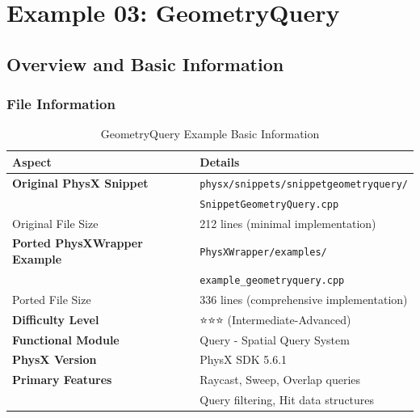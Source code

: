 
\section{Example 03: GeometryQuery}

\subsection{Overview and Basic Information}

\subsubsection{File Information}

\begin{table}[h]
\centering
\begin{tabular}{|l|l|}
\hline
\textbf{Aspect} & \textbf{Details} \\
\hline
\textbf{Original PhysX Snippet} & \texttt{physx/snippets/snippetgeometryquery/} \\
 & \texttt{SnippetGeometryQuery.cpp} \\
\hline
Original File Size & 212 lines (minimal implementation) \\
\hline
\textbf{Ported PhysXWrapper Example} & \texttt{PhysXWrapper/examples/} \\
 & \texttt{example\_geometryquery.cpp} \\
\hline
Ported File Size & 336 lines (comprehensive implementation) \\
\hline
\textbf{Difficulty Level} & ⭐⭐⭐ (Intermediate-Advanced) \\
\hline
\textbf{Functional Module} & Query - Spatial Query System \\
\hline
\textbf{PhysX Version} & PhysX SDK 5.6.1 \\
\hline
\textbf{Primary Features} & Raycast, Sweep, Overlap queries \\
 & Query filtering, Hit data structures \\
\hline
\end{tabular}
\caption{GeometryQuery Example Basic Information}
\end{table}

